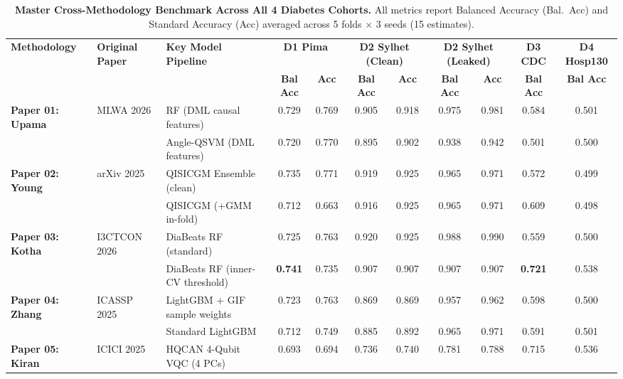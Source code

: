 \documentclass[11pt,a4paper]{article}
\begin{document}
\begin{table}[H]
\centering\footnotesize
\caption{\textbf{Master Cross-Methodology Benchmark Across All 4 Diabetes Cohorts.} All metrics report Balanced Accuracy (Bal.\ Acc) and Standard Accuracy (Acc) averaged across 5 folds $\times$ 3 seeds (15 estimates).}
\label{tab:master_comparison}
\begin{adjustbox}{width=\textwidth}
\begin{tabular}{lllcccccccc}
\toprule
\multirow{2}{*}{\textbf{Methodology}} & \multirow{2}{*}{\textbf{Original Paper}} & \multirow{2}{*}{\textbf{Key Model Pipeline}} & \multicolumn{2}{c}{\textbf{D1 Pima}} & \multicolumn{2}{c}{\textbf{D2 Sylhet (Clean)}} & \multicolumn{2}{c}{\textbf{D2 Sylhet (Leaked)}} & \multicolumn{1}{c}{\textbf{D3 CDC}} & \multicolumn{1}{c}{\textbf{D4 Hosp130}} \\
\cmidrule(lr){4-5} \cmidrule(lr){6-7} \cmidrule(lr){8-9} \cmidrule(lr){10-10} \cmidrule(lr){11-11}
& & & \textbf{Bal Acc} & \textbf{Acc} & \textbf{Bal Acc} & \textbf{Acc} & \textbf{Bal Acc} & \textbf{Acc} & \textbf{Bal Acc} & \textbf{Bal Acc} \\
\midrule
\textbf{Paper 01: Upama} & MLWA 2026 & RF (DML causal features) & 0.729 & 0.769 & 0.905 & 0.918 & 0.975 & 0.981 & 0.584 & 0.501 \\
& & Angle-QSVM (DML features) & 0.720 & 0.770 & 0.895 & 0.902 & 0.938 & 0.942 & 0.501 & 0.500 \\
\addlinespace
\textbf{Paper 02: Young} & arXiv 2025 & QISICGM Ensemble (clean) & 0.735 & 0.771 & 0.919 & 0.925 & 0.965 & 0.971 & 0.572 & 0.499 \\
& & QISICGM (+GMM in-fold) & 0.712 & 0.663 & 0.916 & 0.925 & 0.965 & 0.971 & 0.609 & 0.498 \\
\addlinespace
\textbf{Paper 03: Kotha} & I3CTCON 2026 & DiaBeats RF (standard) & 0.725 & 0.763 & 0.920 & 0.925 & 0.988 & 0.990 & 0.559 & 0.500 \\
& & DiaBeats RF (inner-CV threshold) & \textbf{0.741} & 0.735 & 0.907 & 0.907 & 0.907 & 0.907 & \textbf{0.721} & 0.538 \\
\addlinespace
\textbf{Paper 04: Zhang} & ICASSP 2025 & LightGBM + GIF sample weights & 0.723 & 0.763 & 0.869 & 0.869 & 0.957 & 0.962 & 0.598 & 0.500 \\
& & Standard LightGBM & 0.712 & 0.749 & 0.885 & 0.892 & 0.965 & 0.971 & 0.591 & 0.501 \\
\addlinespace
\textbf{Paper 05: Kiran} & ICICI 2025 & HQCAN 4-Qubit VQC (4 PCs) & 0.693 & 0.694 & 0.736 & 0.740 & 0.781 & 0.788 & 0.715 & 0.536 \\

\end{tabular}
\end{adjustbox}
\end{table}
\end{document}
